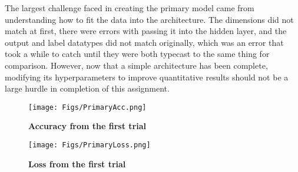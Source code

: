 The largest challenge faced in creating the primary model came from understanding how to fit the data into the architecture. The dimensions did not match at first, there were errors with passing it into the hidden layer, and the output and label datatypes did not match originally, which was an error that took a while to catch until they were both typecast to the same thing for comparison. However, now that a simple architecture has been complete, modifying its hyperparameters to improve quantitative results should not be a large hurdle in completion of this assignment. 
\begin{figure}[!ht]
    \centering
    \texttt{[image: Figs/PrimaryAcc.png]}
    \caption{\textbf{Accuracy from the first trial}}
\end{figure}
\begin{figure}[!ht]
    \centering
    \texttt{[image: Figs/PrimaryLoss.png]}
    \caption{\textbf{Loss from the first trial}}
\end{figure}

